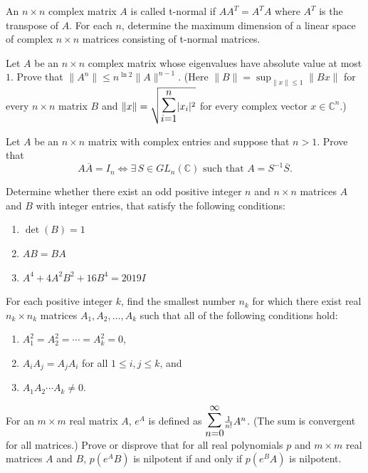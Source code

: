 \documentclass[12pt]{article}
\let\oldsum\sum
\renewcommand{\sum}{\mathlarger{\mathlarger{\oldsum}}}
\begin{document}
\begin{problem}
An $n\times n$ complex matrix $A$ is called t-normal if $AA^T=A^TA$ where $A^T$ is the transpose of $A$. For each $n$, determine the maximum dimension of a linear space of complex $n\times n$ matrices consisting of t-normal matrices.
\end{problem}

\begin{problem}
Let $A$ be an $n\times n$ complex matrix whose eigenvalues have absolute value at most $1$. Prove that $\|A^n\| \le n^{\ln 2}\|A\|^{n-1}$. (Here $\|B\| = \sup_{\|x\|\le 1}\|Bx\|$ for every $n\times n$ matrix $B$ and $\|x\| = \sqrt{\sum_{i=1}^n |x_i|^2}$ for every complex vector $x\in\mathbb{C}^n$.)
\end{problem}

\begin{problem}
Let $A$ be an $n\times n$ matrix with complex entries and suppose that $n>1$. Prove that
\[
A\overline{A} = I_n \iff \exists\, S\in GL_n(\mathbb{C}) \text{ such that } A = S^{-1}\overline{S}.
\]
\end{problem}

\begin{problem}
Determine whether there exist an odd positive integer $n$ and $n\times n$ matrices $A$ and $B$ with integer entries, that satisfy the following conditions:
\begin{enumerate}[label=(\alph*)]
\item $\det(B)=1$
\item $AB=BA$
\item $A^4+4A^2B^2+16B^4 = 2019I$
\end{enumerate}
\end{problem}

\begin{problem}
For each positive integer $k$, find the smallest number $n_k$ for which there exist real $n_k\times n_k$ matrices $A_1,A_2,\dots,A_k$ such that all of the following conditions hold:
\begin{enumerate}[label=(\arabic*)]
\item $A_1^2=A_2^2=\cdots=A_k^2=0$,
\item $A_iA_j=A_jA_i$ for all $1\le i,j\le k$, and
\item $A_1A_2\cdots A_k \ne 0$.
\end{enumerate}
\end{problem}

\begin{problem}
For an $m\times m$ real matrix $A$, $e^A$ is defined as $\sum_{n=0}^\infty \frac1{n!}A^n$. (The sum is convergent for all matrices.) Prove or disprove that for all real polynomials $p$ and $m\times m$ real matrices $A$ and $B$, $p(e^AB)$ is nilpotent if and only if $p(e^BA)$ is nilpotent.
\end{problem}
\end{document}
